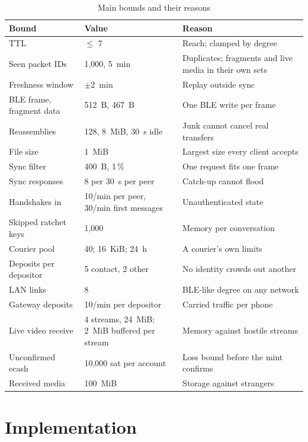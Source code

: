 \documentclass[conference]{IEEEtran}
\begin{document}
\begin{table}[t]
\caption{Main bounds and their reasons}
\label{tab:caps}
\centering
\scriptsize
\begin{tabular}{@{}L{2.35cm}L{1.55cm}L{3.55cm}@{}}
\toprule
Bound & Value & Reason \\
\midrule
TTL & $\le$ 7 & Reach; clamped by degree \\
Seen packet IDs & 1,000, 5~min & Duplicates; fragments and live media in their own sets \\
Freshness window & $\pm$2~min & Replay outside sync \\
BLE frame, fragment data & 512~B, 467~B & One BLE write per frame \\
Reassemblies & 128, 8~MiB, 30~s idle & Junk cannot cancel real transfers \\
File size & 1~MiB & Largest size every client accepts \\
Sync filter & 400~B, 1\,\% & One request fits one frame \\
Sync responses & 8 per 30~s per peer & Catch-up cannot flood \\
Handshakes in & 10/min per peer, 30/min first messages & Unauthenticated state \\
Skipped ratchet keys & 1,000 & Memory per conversation \\
Courier pool & 40; 16~KiB; 24~h & A courier's own limits \\
Deposits per depositor & 5 contact, 2 other & No identity crowds out another \\
LAN links & 8 & BLE-like degree on any network \\
Gateway deposits & 10/min per depositor & Carried traffic per phone \\
Live video receive & 4 streams, 24~MiB; 2~MiB buffered per stream & Memory against hostile streams \\
Unconfirmed ecash & 10,000 sat per account & Loss bound before the mint confirms \\
Received media & 100~MiB & Storage against strangers \\
\bottomrule
\end{tabular}
\end{table}

\section{Implementation}
\label{sec:impl}
\end{document}
